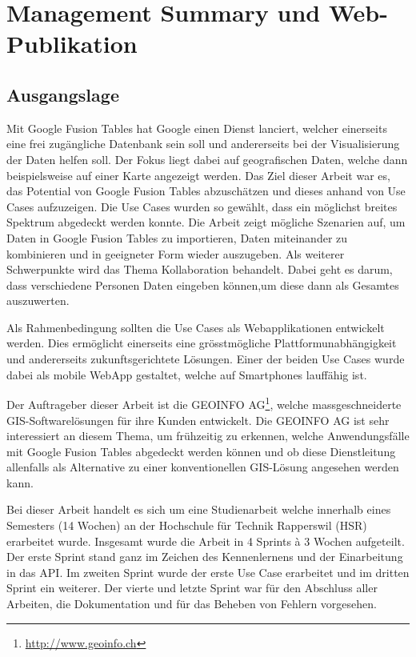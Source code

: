 \chapter*{Management Summary und Web-Publikation}
\thispagestyle{scrheadings}

\section*{Ausgangslage}
Mit Google Fusion Tables hat Google einen Dienst lanciert, welcher einerseits eine frei zugängliche Datenbank sein soll und andererseits bei der Visualisierung der Daten helfen soll. Der Fokus liegt dabei auf geografischen Daten, welche dann beispielsweise auf einer Karte angezeigt werden.
Das Ziel dieser Arbeit war es, das Potential von Google Fusion Tables abzuschätzen und dieses anhand von Use Cases aufzuzeigen. Die Use Cases wurden so gewählt, dass ein möglichst breites Spektrum abgedeckt werden konnte. Die Arbeit zeigt mögliche Szenarien auf, um Daten in Google Fusion Tables zu importieren, Daten miteinander zu kombinieren und in geeigneter Form wieder auszugeben. Als weiterer Schwerpunkte wird das Thema Kollaboration behandelt. Dabei geht es darum, dass verschiedene Personen Daten eingeben können,um diese dann als Gesamtes auszuwerten.

Als Rahmenbedingung sollten die Use Cases als Webapplikationen entwickelt werden. Dies ermöglicht einerseits eine grösstmögliche Plattformunabhängigkeit und andererseits zukunftsgerichtete Lösungen. Einer der beiden Use Cases wurde dabei als mobile \gls{WebApp} gestaltet, welche auf Smartphones lauffähig ist.

Der Auftrageber dieser Arbeit ist die GEOINFO AG\footnote{\url{http://www.geoinfo.ch}}, welche massgeschneiderte \gls{GIS}-Softwarelösungen für ihre Kunden entwickelt. Die GEOINFO AG ist sehr interessiert an diesem Thema, um frühzeitig zu erkennen, welche Anwendungsfälle mit Google Fusion Tables abgedeckt werden können und ob diese Dienstleitung allenfalls als Alternative zu einer konventionellen \gls{GIS}-Lösung angesehen werden kann.

Bei dieser Arbeit handelt es sich um eine Studienarbeit welche innerhalb eines Semesters (14 Wochen) an der Hochschule für Technik Rapperswil (HSR) erarbeitet wurde. Insgesamt wurde die Arbeit in 4 Sprints à 3 Wochen aufgeteilt. Der erste Sprint stand ganz im Zeichen des Kennenlernens und der Einarbeitung in das \gls{API}. Im zweiten Sprint wurde der erste Use Case erarbeitet und im dritten Sprint ein weiterer. Der vierte und letzte Sprint war für den Abschluss aller Arbeiten, die Dokumentation und für das Beheben von Fehlern vorgesehen.

